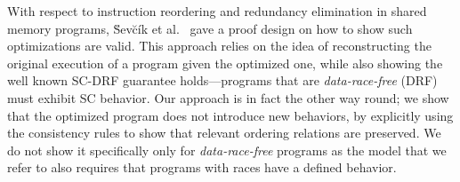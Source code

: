     With respect to instruction reordering and redundancy elimination in shared memory programs, \u{S}ev\u{c}\'{i}k et al.~\cite{Sevcik2} gave a proof design on how to show such optimizations are valid. 
    This approach relies on the idea of reconstructing the original execution of a program given the optimized one, while also showing the well known SC-DRF guarantee holds---programs that are \textit{data-race-free} (DRF) must exhibit SC behavior. 
    Our approach is in fact the other way round; we show that the optimized program does not introduce new behaviors, by explicitly using the consistency rules to show that relevant ordering relations are preserved. 
    We do not show it specifically only for \textit{data-race-free} programs as the model that we refer to also requires that programs with races have a defined behavior. 